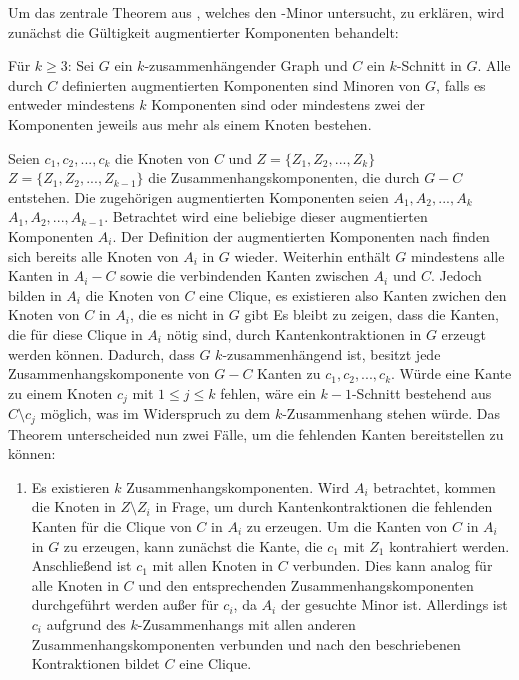 Um das zentrale Theorem aus \cite{Kez92}, welches den \kdd-Minor untersucht, zu erklären, wird zunächst die Gültigkeit augmentierter Komponenten behandelt:
\begin{theorem}
Für $k \geq 3$: Sei $G$ ein $k$-zusammenhängender Graph und $C$ ein $k$-Schnitt in $G$.
Alle durch $C$ definierten augmentierten Komponenten sind Minoren von $G$, falls es entweder mindestens $k$ Komponenten sind oder mindestens zwei der Komponenten jeweils aus mehr als einem Knoten bestehen.
\end{theorem}
\begin{beweis}
Seien $c_1, c_2, ..., c_k$ die Knoten von $C$ und $Z = \{Z_1, Z_2, ..., Z_k\}$ \bzw $Z = \{Z_1, Z_2, ..., Z_{k-1}\}$ die Zusammenhangskomponenten, die durch $G-C$ entstehen.
Die zugehörigen augmentierten Komponenten seien $A_1, A_2, ..., A_k$ \bzw $A_1, A_2, ..., A_{k-1}$.
Betrachtet wird eine beliebige dieser augmentierten Komponenten $A_i$.
Der Definition der augmentierten Komponenten nach finden sich bereits alle Knoten von $A_i$ in $G$ wieder.
Weiterhin enthält $G$ mindestens alle Kanten in $A_i - C$ sowie die verbindenden Kanten zwischen $A_i$ und $C$.
Jedoch bilden in $A_i$ die Knoten von $C$ eine Clique, es existieren also \ggf Kanten zwichen den Knoten von $C$ in $A_i$, die es nicht in $G$ gibt
Es bleibt zu zeigen, dass die Kanten, die für diese Clique in $A_i$ nötig sind, durch Kantenkontraktionen in $G$ erzeugt werden können.
Dadurch, dass $G$ $k$-zusammenhängend ist, besitzt jede Zusammenhangskomponente von $G - C$ Kanten zu $c_1, c_2, ..., c_k$.
Würde eine Kante zu einem Knoten $c_j$ mit $1 \leq j \leq k$ fehlen, wäre ein $k-1$-Schnitt bestehend aus $C \setminus c_j$ möglich, was im Widerspruch zu dem $k$-Zusammenhang stehen würde.
Das Theorem unterscheided nun zwei Fälle, um die fehlenden Kanten bereitstellen zu können:
\begin{enumerate}
\item Es existieren $k$ Zusammenhangskomponenten.
      Wird $A_i$ betrachtet, kommen die Knoten in $Z \setminus Z_i$ in Frage, um durch Kantenkontraktionen die fehlenden Kanten für die Clique von $C$ in $A_i$ zu erzeugen.
      Um die Kanten von $C$ in $A_i$ in $G$ zu erzeugen, kann zunächst die Kante, die $c_1$ mit $Z_1$ kontrahiert werden.
      Anschließend ist $c_1$ mit allen Knoten in $C$ verbunden.
      Dies kann analog für alle Knoten in $C$ und den entsprechenden Zusammenhangskomponenten durchgeführt werden außer für $c_i$, da $A_i$ der gesuchte Minor ist.
      Allerdings ist $c_i$ aufgrund des $k$-Zusammenhangs mit allen anderen Zusammenhangskomponenten verbunden und nach den beschriebenen Kontraktionen bildet $C$ eine Clique.

\end{enumerate}
\end{beweis}
